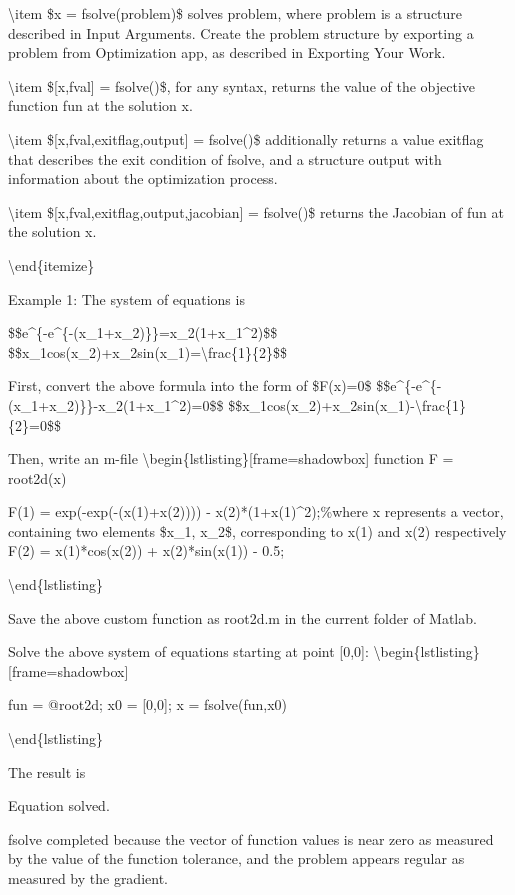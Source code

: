 \documentclass[10pt,math=newtx,citestyle=gb7714-2015,bibstyle=gb7714-2015]{elegantbook}
\begin{document}
	\textbackslash{}item \$x = fsolve(problem)\$ solves problem, where problem is a structure described in Input Arguments. Create the problem structure by exporting a problem from Optimization app, as described in Exporting Your Work.
	
	\textbackslash{}item \$[x,fval] = fsolve()\$, for any syntax, returns the value of the objective function fun at the solution x.
	
	
	\textbackslash{}item \$[x,fval,exitflag,output] = fsolve()\$ additionally returns a value exitflag that describes the exit condition of fsolve, and a structure output with information about the optimization process.
	
	\textbackslash{}item \$[x,fval,exitflag,output,jacobian] = fsolve()\$ returns the Jacobian of fun at the solution x.
	
	
	\textbackslash{}end\{itemize\}
	
	Example 1: The system of equations is
	
	\$\$e\^{}\{-e\^{}\{-(x\_1+x\_2)\}\}=x\_2(1+x\_1\^{}2)\$\$
	\$\$x\_1cos(x\_2)+x\_2sin(x\_1)=\textbackslash{}frac\{1\}\{2\}\$\$
	
	First, convert the above formula into the form of \$F(x)=0\$
	\$\$e\^{}\{-e\^{}\{-(x\_1+x\_2)\}\}-x\_2(1+x\_1\^{}2)=0\$\$
	\$\$x\_1cos(x\_2)+x\_2sin(x\_1)-\textbackslash{}frac\{1\}\{2\}=0\$\$
	
	Then, write an m-file
	\textbackslash{}begin\{lstlisting\}[frame=shadowbox]
	function F = root2d(x)
	
	F(1) = exp(-exp(-(x(1)+x(2)))) - x(2)*(1+x(1)\^{}2);\%where x represents a vector, containing two elements \$x\_1, x\_2\$, corresponding to x(1) and x(2) respectively
	F(2) = x(1)*cos(x(2)) + x(2)*sin(x(1)) - 0.5;
	
	\textbackslash{}end\{lstlisting\}
	
	Save the above custom function as root2d.m in the current folder of Matlab.
	
	Solve the above system of equations starting at point [0,0]:
	\textbackslash{}begin\{lstlisting\}[frame=shadowbox]
	
	fun = @root2d;
	x0 = [0,0];
	x = fsolve(fun,x0)
	
	\textbackslash{}end\{lstlisting\}
	
	The result is
	
	Equation solved.
	
	fsolve completed because the vector of function values is near zero as measured by the value of the function tolerance, and
	the problem appears regular as measured by the gradient.
	
\end{document}
